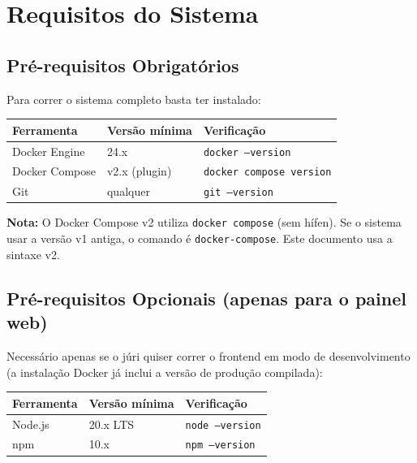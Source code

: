 \documentclass[12pt,a4paper]{article}
\newcommand{\cmd}[1]{\texttt{\small\color{accent}#1}}
\begin{document}
\section{Requisitos do Sistema}

\subsection{Pré-requisitos Obrigatórios}

Para correr o sistema completo basta ter instalado:

\begin{center}
\begin{tabular}{lll}
\toprule
\textbf{Ferramenta} & \textbf{Versão mínima} & \textbf{Verificação} \\
\midrule
Docker Engine       & 24.x                   & \cmd{docker --version} \\
Docker Compose      & v2.x (plugin)          & \cmd{docker compose version} \\
Git                 & qualquer               & \cmd{git --version} \\
\bottomrule
\end{tabular}
\end{center}

\begin{mdframed}[style=warningbox]
\textbf{Nota:} O Docker Compose v2 utiliza \cmd{docker compose} (sem hífen). Se o sistema usar a versão v1 antiga, o comando é \cmd{docker-compose}. Este documento usa a sintaxe v2.
\end{mdframed}

\subsection{Pré-requisitos Opcionais (apenas para o painel web)}

Necessário apenas se o júri quiser correr o frontend em modo de desenvolvimento (a instalação Docker já inclui a versão de produção compilada):

\begin{center}
\begin{tabular}{lll}
\toprule
\textbf{Ferramenta} & \textbf{Versão mínima} & \textbf{Verificação} \\
\midrule
Node.js             & 20.x LTS               & \cmd{node --version} \\
npm                 & 10.x                   & \cmd{npm --version} \\
\bottomrule
\end{tabular}
\end{center}
\end{document}
